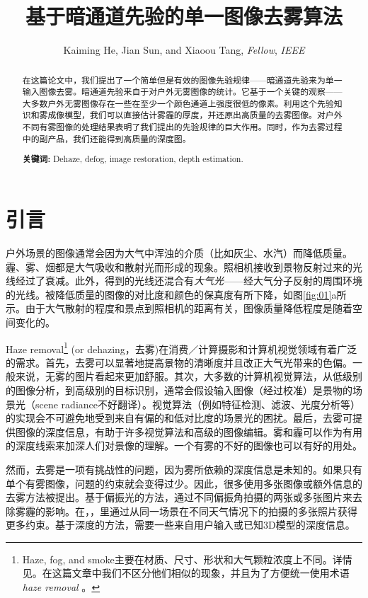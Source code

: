 \documentclass{ctexart}
\title{基于暗通道先验的单一图像去雾算法}
\author{Kaiming He, Jian Sun, and Xiaoou Tang, \emph{Fellow}, \emph{IEEE}}
\begin{document}
\maketitle

\begin{abstract}
	在这篇论文中，我们提出了一个简单但是有效的图像先验规律——暗通道先验来为单一输入图像去雾。暗通道先验来自于对户外无雾图像的统计。它基于一个关键的观察——大多数户外无雾图像存在一些在至少一个颜色通道上强度很低的像素。利用这个先验知识和雾成像模型，我们可以直接估计雾霾的厚度，并还原出高质量的去雾图像。对户外不同有雾图像的处理结果表明了我们提出的先验规律的巨大作用。同时，作为去雾过程中的副产品，我们还能得到高质量的深度图。
									
	\textbf{关键词:} Dehaze, defog, image restoration, depth estimation.
\end{abstract}

\section{引言}
户外场景的图像通常会因为大气中浑浊的介质（比如灰尘、水汽）而降低质量。霾、雾、烟都是大气吸收和散射光而形成的现象。照相机接收到景物反射过来的光线经过了衰减。此外，得到的光线还混合有\emph{大气光}\cite{Koschmieder1924}——经大气分子反射的周围环境的光线。被降低质量的图像的对比度和颜色的保真度有所下降，如图\ref{fig:01}a所示。由于大气散射的程度和景点到照相机的距离有关，图像质量降低程度是随着空间变化的。\par

Haze removal\footnote{Haze, fog, and smoke主要在材质、尺寸、形状和大气颗粒浓度上不同。详情见\cite{NarasimhanNayar2002}。在这篇文章中我们不区分他们相似的现象，并且为了方便统一使用术语\emph{haze removal }。} (or dehazing，去雾)在消费／计算摄影和计算机视觉领域有着广泛的需求。首先，去雾可以显著地提高景物的清晰度并且改正大气光带来的色偏。一般来说，无雾的图片看起来更加舒服。其次，大多数的计算机视觉算法，从低级别的图像分析，到高级别的目标识别，通常会假设输入图像（经过校准）是景物的场景光（scene radiance不好翻译）。视觉算法（例如特征检测、滤波、光度分析等）的实现会不可避免地受到来自有偏的和低对比度的场景光的困扰。最后，去雾可提供图像的深度信息，有助于许多视觉算法和高级的图像编辑。雾和霾可以作为有用的深度线索来加深人们对景像的理解。一个有雾的不好的图像也可以有好的用处。\par

然而，去雾是一项有挑战性的问题，因为雾所依赖的深度信息是未知的。如果只有单个有雾图像，问题的约束就会变得过少。因此，很多使用多张图像或额外信息的去雾方法被提出。基于偏振光的方法\cite{SchechnerNarasimhanNayar2001}，\cite{ShwartzNamerSchechner2006}通过不同偏振角拍摄的两张或多张图片来去除雾霾的影响。在\cite{NarasimhanNayar2000}，\cite{NayarNarasimhan1999}，\cite{NarasimhanNayar2003_1}里通过从同一场景在不同天气情况下的拍摄的多张照片获得更多约束。基于深度的方法\cite{KopfNeubertChenCohenCohenOrDeussenUyttendaeleLischinski2008}，\cite{NarasimhanNayar2003_2}需要一些来自用户输入或已知3D模型的深度信息。\par
\end{document}
